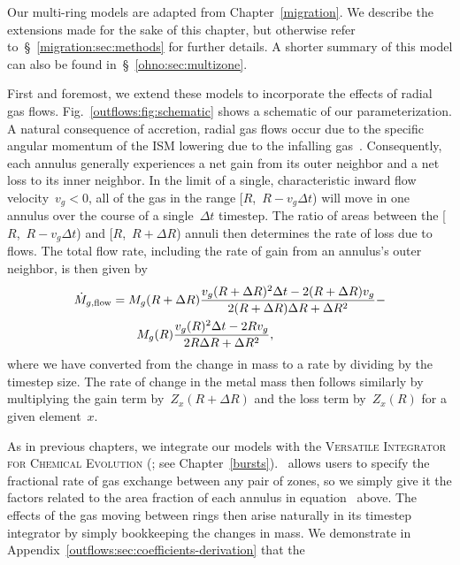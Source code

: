 Our multi-ring models are adapted from Chapter~\ref{migration}.
We describe the extensions made for the sake of this chapter, but otherwise
refer to~\S~\ref{migration:sec:methods} for further details.
A shorter summary of this model can also be found
in~\S~\ref{ohno:sec:multizone}.
\par
First and foremost, we extend these models to incorporate the effects of radial
gas flows.
Fig.~\ref{outflows:fig:schematic} shows a schematic of our parameterization.
A natural consequence of accretion, radial gas flows occur due to the specific
angular momentum of the ISM lowering due to the infalling gas~\citep{Lacey1985,
Bilitewski2012}.
Consequently, each annulus generally experiences a net gain from its outer
neighbor and a net loss to its inner neighbor.
In the limit of a single, characteristic inward flow velocity~$v_g < 0$, all of
the gas in the range [$R$,~$R - v_g \Delta t$) will move in one annulus over
the course of a single~$\Delta t$ timestep.
The ratio of areas between the [$R$,~$R - v_g \Delta t$) and
[$R$,~$R + \Delta R$) annuli then determines the rate of loss due to flows.
The total flow rate, including the rate of gain from an annulus's outer
neighbor, is then given by
\begin{equation}\begin{split}
\dot{M}_{g,\text{flow}} &= M_g(R + \Delta R) \frac{
	v_g(R + \Delta R)^2 \Delta t - 2 (R + \Delta R) v_g
}{
	2 (R + \Delta R) \Delta R + \Delta R^2
} -
\\
&\qquad M_g(R) \frac{
	v_g(R)^2 \Delta t - 2 R v_g
}{
	2 R \Delta R + \Delta R^2
},
\label{outflows:eq:mdot-gas-flow-areafrac}
\end{split}\end{equation}
where we have converted from the change in mass to a rate by dividing by the
timestep size.
The rate of change in the metal mass then follows similarly by multiplying the
gain term by~$Z_x(R + \Delta R)$ and the loss term by~$Z_x(R)$ for a given
element~$x$.
\par
As in previous chapters, we integrate our models with the
\textsc{Versatile Integrator for Chemical Evolution} (\vice; see
Chapter~\ref{bursts}).
\vice~allows users to specify the fractional rate of gas exchange between any
pair of zones, so we simply give it the factors related to the area fraction of
each annulus in equation~ above.
The effects of the gas moving between rings then arise naturally in its
timestep integrator by simply bookkeeping the changes in mass.
We demonstrate in Appendix~\ref{outflows:sec:coefficients-derivation} that the
